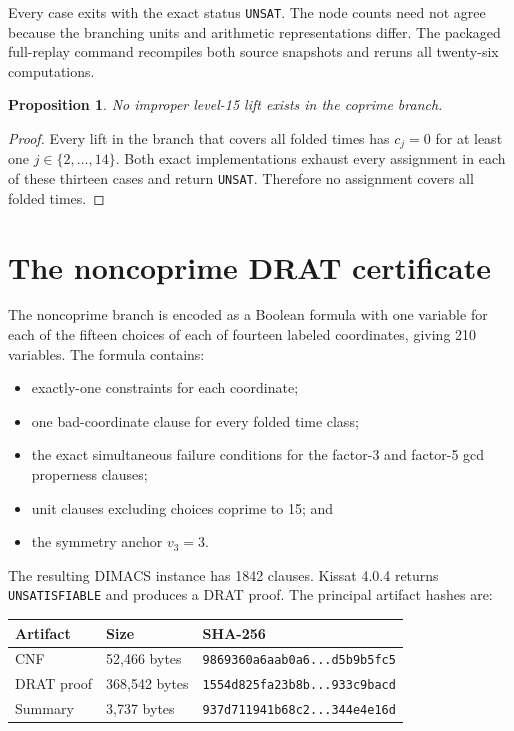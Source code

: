 \documentclass[11pt]{article}
\newtheorem{proposition}[theorem]{Proposition}
\begin{document}
Every case exits with the exact status \texttt{UNSAT}.  The node counts need
not agree because the branching units and arithmetic representations differ.
The packaged full-replay command recompiles both source snapshots and reruns
all twenty-six computations.

\begin{proposition}
\label{prop:coprime}
No improper level-15 lift exists in the coprime branch.
\end{proposition}

\begin{proof}
Every lift in the branch that covers all folded times has \(c_j=0\) for at
least one \(j\in\{2,\ldots,14\}\).  Both exact implementations exhaust every
assignment in each of these thirteen cases and return \texttt{UNSAT}.
Therefore no assignment covers all folded times.
\end{proof}

\section{The noncoprime DRAT certificate}

The noncoprime branch is encoded as a Boolean formula with one variable for
each of the fifteen choices of each of fourteen labeled coordinates, giving
210 variables.  The formula contains:

\begin{itemize}[leftmargin=2em]
  \item exactly-one constraints for each coordinate;
  \item one bad-coordinate clause for every folded time class;
  \item the exact simultaneous failure conditions for the factor-3 and
        factor-5 gcd properness clauses;
  \item unit clauses excluding choices coprime to 15; and
  \item the symmetry anchor \(v_3=3\).
\end{itemize}

The resulting DIMACS instance has 1842 clauses.  Kissat 4.0.4 returns
\texttt{UNSATISFIABLE} and produces a DRAT proof.  The principal artifact
hashes are:

\begin{center}
\begin{tabular}{lll}
\toprule
Artifact & Size & SHA-256\\
\midrule
CNF & 52,466 bytes &
\texttt{9869360a6aab0a6...d5b9b5fc5}\\
DRAT proof & 368,542 bytes &
\texttt{1554d825fa23b8b...933c9bacd}\\
Summary & 3,737 bytes &
\texttt{937d711941b68c2...344e4e16d}\\
\bottomrule
\end{tabular}
\end{center}
\end{document}

